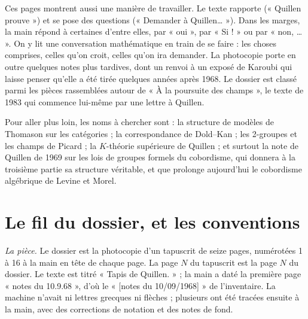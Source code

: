 \documentclass[11pt,a4paper]{article}
\begin{document}
\begin{resume}
Ces pages montrent aussi une manière de travailler. Le texte rapporte
(« Quillen prouve ») et se pose des questions (« Demander à Quillen… »). Dans les
marges, la main répond à certaines d'entre elles, par « oui », par « Si ! » ou
par « non, … ». On y lit une conversation mathématique en train de se faire :
les choses comprises, celles qu'on croit, celles qu'on ira demander. La
photocopie porte en outre quelques notes plus tardives, dont un renvoi à un
exposé de Karoubi qui laisse penser qu'elle a été tirée quelques années après
1968. Le dossier est classé parmi les pièces rassemblées autour de « À la
poursuite des champs », le texte de 1983 qui commence lui-même par une lettre à
Quillen.

Pour aller plus loin, les noms à chercher sont : la structure de modèles de
Thomason sur les catégories ; la correspondance de Dold--Kan ; les 2-groupes et
les champs de Picard ; la $K$-théorie supérieure de Quillen ; et surtout la note
de Quillen de 1969 sur les lois de groupes formels du cobordisme, qui donnera à
la troisième partie sa structure véritable, et que prolonge aujourd'hui le
cobordisme algébrique de Levine et Morel.

\end{resume}

\section*{Le fil du dossier, et les conventions}

\emph{La pièce.} Le dossier est la photocopie d'un tapuscrit de seize pages,
numérotées 1 à 16 à la main en tête de chaque page. La page $N$ du tapuscrit
est la page $N$ du dossier. Le texte est titré « Tapis de Quillen. » ; la main
a daté la première page « notes du 10.9.68 », d'où le « [notes du 10/09/1968] »
de l'inventaire. La machine n'avait ni lettres grecques ni flèches ; plusieurs
ont été tracées ensuite à la main, avec des corrections de notation et des
notes de fond.
\end{document}
